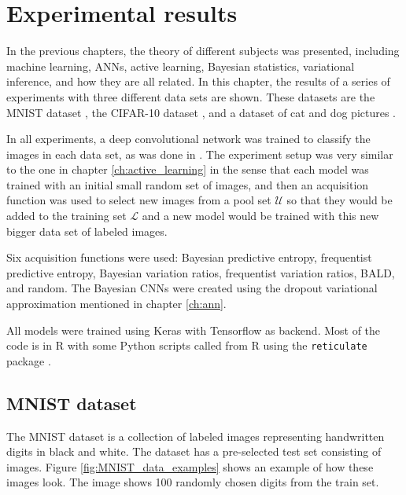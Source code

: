 
\chapter{Experimental results}
\label{ch:results}

In the previous chapters, the theory of different subjects was presented, including machine learning, ANNs, active learning, Bayesian statistics, variational inference, and how they are all related. In this chapter, the results of a series of experiments with three different data sets are shown. These datasets are the MNIST dataset \cite{lecun1998gradient}, the CIFAR-10 dataset \cite{krizhevsky2009learning}, and a dataset of cat and dog pictures \cite{elson2007asirra}.

In all experiments, a deep convolutional network was trained to classify the images in each data set, as was done in \cite{Gal2016Active}. The experiment setup was very similar to the one in chapter \ref{ch:active_learning} in the sense that each model was trained with an initial small random set of images, and then an acquisition function was used to select new images from a pool set $\mathcal{U}$ so that they would be added to the training set $\mathcal{L}$ and a new model would be trained with this new bigger data set of labeled images.

Six acquisition functions were used: Bayesian predictive entropy, frequentist predictive entropy, Bayesian variation ratios, frequentist variation ratios, BALD, and random. The Bayesian CNNs were created using the dropout variational approximation mentioned in chapter \ref{ch:ann}.

All models were trained using Keras\cite{chollet2015keras} with Tensorflow \cite{tensorflow2015-whitepaper} as backend. Most of the code is in R with some Python scripts called from R using the \texttt{reticulate} package \cite{reticulate_package}.

\section{MNIST dataset}

The MNIST dataset is a collection of  labeled images representing handwritten digits in black and white. The dataset has a pre-selected test set consisting of  images. Figure \ref{fig:MNIST_data_examples} shows an example of how these images look. The image shows 100 randomly chosen digits from the train set.

